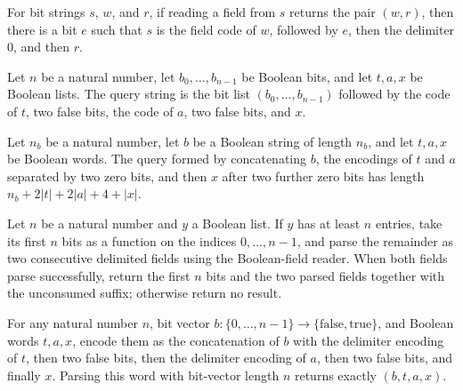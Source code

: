 \begin{theorem}
\label{Complexity.Meyer.readField_eq_some}
\leanok
{}
For bit strings $s$, $w$, and $r$, if reading a field from $s$ returns the pair $(w,r)$,
then there is a bit $e$ such that $s$ is the field code of $w$, followed by $e$, then
the delimiter $0$, and then $r$.
\end{theorem}

\begin{definition}
\label{Complexity.Meyer.query}
\leanok
{}
Let $n$ be a natural number, let $b_0,\ldots,b_{n-1}$ be Boolean bits, and let
$t,a,x$ be Boolean lists. The query string is the bit list
$(b_0,\ldots,b_{n-1})$ followed by the code of $t$, two false bits, the code of
$a$, two false bits, and $x$.
\end{definition}

\begin{theorem}
\label{Complexity.Meyer.length_query}
\leanok
{}
Let $n_b$ be a natural number, let $b$ be a Boolean string of length $n_b$, and let
$t,a,x$ be Boolean words. The query formed by concatenating $b$, the encodings of $t$
and $a$ separated by two zero bits, and then $x$ after two further zero bits has length
$n_b+2|t|+2|a|+4+|x|$.
\end{theorem}

\begin{definition}
\label{Complexity.Meyer.parseQ}
\leanok
{}
Let $n$ be a natural number and $y$ a Boolean list. If $y$ has at least $n$ entries,
take its first $n$ bits as a function on the indices $0,\ldots,n-1$, and parse
the remainder as two consecutive delimited fields using the Boolean-field reader. When
both fields parse successfully, return the first $n$ bits and the two parsed fields
together with the unconsumed suffix; otherwise return no result.
\end{definition}

\begin{theorem}
\label{Complexity.Meyer.parseQ_query}
\leanok
{}
For any natural number $n$, bit vector
$b\colon\{0,\ldots,n-1\}\to\{\mathrm{false},\mathrm{true}\}$, and Boolean words $t,a,x$,
encode them as the concatenation of $b$ with the delimiter encoding of $t$, then two
false bits, then the delimiter encoding of $a$, then two false bits, and finally $x$.
Parsing this word with bit-vector length $n$ returns exactly $(b,t,a,x)$.
\end{theorem}


